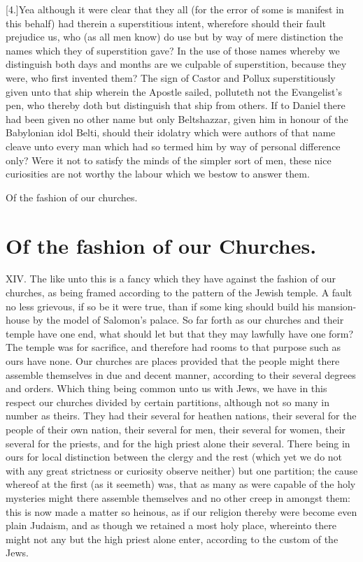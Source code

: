 [4.]Yea although it were clear that they all (for the error of some is manifest in this behalf) had therein a superstitious intent, wherefore should their fault prejudice us, who (as all men know) do use but by way of mere distinction the names which they of superstition gave? In the use of those names whereby we distinguish both days and months are we culpable of superstition, because they were, who first invented them? The sign of Castor and Pollux superstitiously given unto that ship wherein the Apostle sailed, polluteth not the Evangelist’s pen, who thereby doth but distinguish that ship from others. If to Daniel there had been given no other name but only Beltshazzar, given him in honour of the Babylonian idol Belti, should their idolatry which were authors of that name cleave unto every man which had so termed him by way of personal difference only? Were it not to satisfy the minds of the simpler sort of men, these nice curiosities are not worthy the labour which we bestow to answer them.


Of the fashion of our churches.
\section*{Of the fashion of our Churches.}
XIV. The like unto this is a fancy which they have against the fashion of our churches, as being framed according to the pattern of the Jewish temple. A fault no less grievous, if so be it were true, than if some king should build his mansion-house by the model of Salomon’s palace. So far forth as our churches and their temple have one end, what should let but that they may lawfully have one form? The temple was for sacrifice, and therefore had rooms to that purpose such as ours have none. Our churches are places provided that the people might there assemble themselves in due and decent manner, according to their several degrees and orders. Which thing being common unto us with Jews,  we have in this respect our churches divided by certain partitions, although not so many in number as theirs.
 They had their several for heathen nations, their several for the people of their own nation, their several for men, their several for women, their several for the priests, and for the high priest alone their several. There being in ours for local distinction between the clergy and the rest (which yet we do not with any great strictness or curiosity observe neither) but one partition; the cause whereof at the first (as it seemeth) was, that as many as were capable of the holy mysteries might there assemble themselves and no other creep in amongst them: this is now made a matter so heinous, as if our religion thereby were become even plain Judaism, and as though we retained a most holy place, whereinto there might not any but the high priest alone enter, according to the custom of the Jews.


